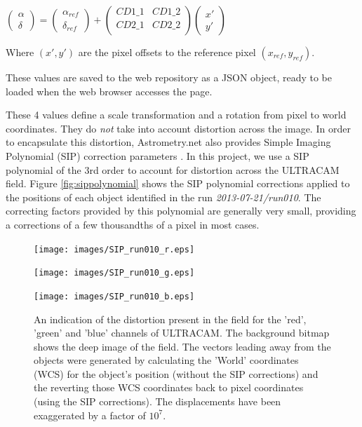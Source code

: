 $\left(\begin{array}{c} \alpha \\ \delta \end{array} \right) = \left(\begin{array}{c} \alpha_{ref} \\ \delta_{ref} \end{array} \right) + 
\left(\begin{array}{cc}  CD1\_1 & CD1\_2 \\ CD2\_1  & CD2\_2 \\ \end{array}\right) 
\left(\begin{array}{c} x' \\ y' \end{array} \right)$

Where $(x', y')$ are the pixel offsets to the reference pixel $(x_{ref}, y_{ref})$.

These values are saved to the web repository as a JSON object, ready to be loaded when the web browser accesses the page. 

These 4 values define a scale transformation and a rotation from pixel to world coordinates. They do \emph{not} take into account distortion across the image. In order to encapsulate this distortion, Astrometry.net also provides Simple Imaging Polynomial (SIP) correction parameters \cite{sippolynomial}. In this project, we use a SIP polynomial of the 3rd order to account for distortion across the ULTRACAM field. Figure \ref{fig:sippolynomial} shows the SIP polynomial corrections applied to the positions of each object identified in the run \emph{2013-07-21/run010}. The correcting factors provided by this polynomial are generally very small, providing a corrections of a few thousandths of a pixel in most cases. 

\begin{figure}
  \centering
  \texttt{[image: images/SIP\_run010\_r.eps]}
  
  \texttt{[image: images/SIP\_run010\_g.eps]}
  
  \texttt{[image: images/SIP\_run010\_b.eps]}

\caption{An indication of the distortion present in the field for the 'red', 'green' and 'blue' channels of ULTRACAM. The background bitmap shows the deep image of the field. The vectors leading away from the objects were generated by calculating the 'World' coordinates (WCS) for the object's position (without the SIP corrections) and the reverting those WCS coordinates back to pixel coordinates (using the SIP corrections). The displacements have been exaggerated by a factor of $10^7$.}
\label{fig:sipfit}
\end{figure}

